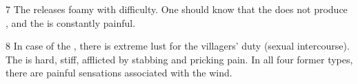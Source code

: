 \begin{translation}
\item [7] The  releases foamy  with difficulty. 
One should know that the  does not produce , and the  is constantly painful. 

\item [8] In case of the , there is extreme lust for the villagers' duty (sexual intercourse).
The  is hard, stiff, afflicted by stabbing and pricking pain.
In all four former types, there are painful sensations associated with the wind.
\end{translation}

